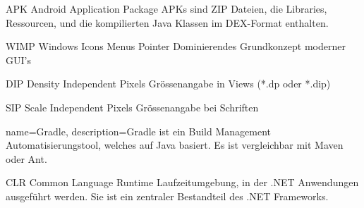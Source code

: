 {APK}
{Android Application Package}
{
	APKs sind ZIP Dateien, die Libraries, Ressourcen, und die kompilierten Java Klassen im DEX-Format enthalten.
}

{WIMP}
{Windows Icons Menus Pointer}
{
	Dominierendes Grundkonzept moderner GUI's
}

{DIP}
{Density Independent Pixels}
{
	Grössenangabe in Views (*.dp oder *.dip)
}

{SIP}
{Scale Independent Pixels}
{
	Grössenangabe bei Schriften
}

{
	name={Gradle},
	description={Gradle ist ein Build Management Automatisierungstool, welches auf Java basiert. Es ist vergleichbar mit Maven oder Ant.}
}

{CLR}
{Common Language Runtime}
{
	Laufzeitumgebung, in der .NET Anwendungen ausgeführt werden. Sie ist ein zentraler Bestandteil des .NET Frameworks. 
}